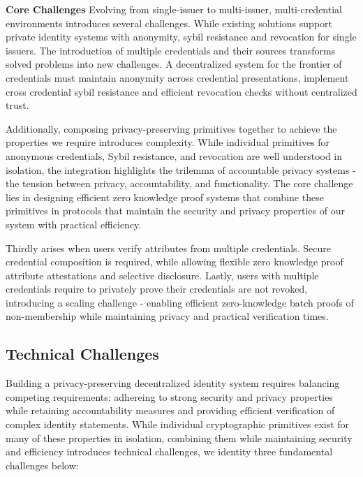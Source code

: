 \noindent \textbf{Core Challenges} Evolving from single-issuer to multi-issuer, multi-credential environments introduces several challenges. While existing solutions support private identity systems with anonymity, sybil resistance and revocation for single issuers. The introduction of multiple credentials and their sources transforms solved problems into new challenges. A decentralized system for the frontier of credentials must maintain anonymity across credential presentations, implement cross credential sybil resistance and efficient revocation checks without centralized trust.

\noindent Additionally, composing privacy-preserving primitives together to achieve the properties we require introduces complexity. While individual primitives for anonymous credentials, Sybil resistance, and revocation are well understood in isolation, the integration highlights the trilemma of accountable privacy systems - the tension between privacy, accountability, and functionality. The core challenge lies in designing efficient zero knowledge proof systems that combine these primitives in protocols that maintain the security and privacy properties of our system with practical efficiency.

\noindent Thirdly arises when users verify attributes from multiple credentials. Secure credential composition is required, while allowing flexible zero knowledge proof attribute attestations and selective disclosure. Lastly, users with multiple credentials require to privately prove their credentials are not revoked, introducing a scaling challenge - enabling efficient zero-knowledge batch proofs of non-membership while maintaining privacy and practical verification times. 




\subsection{Technical Challenges}

Building a privacy-preserving decentralized identity system requires balancing competing requirements: adhereing to strong security and privacy properties while retaining accountability measures and providing efficient verification of complex identity statements. While individual cryptographic primitives exist for many of these properties in isolation, combining them while maintaining security and efficiency introduces technical challenges, we identity three fundamental challenges below: 

